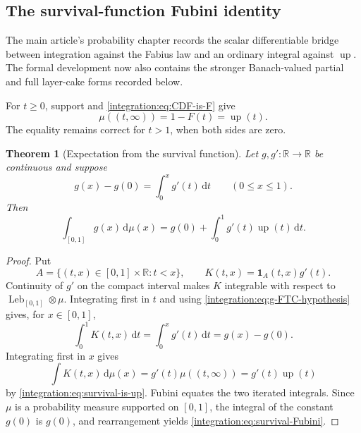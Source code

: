 \documentclass[11pt,oneside]{article}
\newtheorem{theorem}{Theorem}[section]
\theoremstyle{definition}
\theoremstyle{remark}
\newcommand{\R}{\mathbb R}
\newcommand{\Up}{\operatorname{up}}
\newcommand{\dd}{\,\mathrm d}
\begin{document}
\subsection{The survival-function Fubini identity}
\label{integration:sec:survival-fubini}

The main article's probability chapter records the scalar differentiable bridge between
integration against the Fabius law and an ordinary integral against $\Up$.  The formal
development now also contains the stronger Banach-valued partial and full layer-cake forms
recorded below.

For $t\ge0$, support and \eqref{integration:eq:CDF-is-F} give
\begin{equation}
 \mu((t,\infty))=1-F(t)=\Up(t).
 \label{integration:eq:survival-is-up}
\end{equation}
The equality remains correct for $t>1$, when both sides are zero.

\begin{theorem}[Expectation from the survival function]
\label{integration:thm:survival-Fubini}
Let $g,g':\R\to\R$ be continuous and suppose
\begin{equation}
 g(x)-g(0)=\int_0^x g'(t)\dd t
 \qquad(0\le x\le1).
 \label{integration:eq:g-FTC-hypothesis}
\end{equation}
Then
\begin{equation}
 \int_{[0,1]}g(x)\dd\mu(x)
 =g(0)+\int_0^1 g'(t)\Up(t)\dd t.
 \label{integration:eq:survival-Fubini}
\end{equation}
\end{theorem}

\begin{proof}
Put
\begin{equation}
 A=\{(t,x)\in[0,1]\times\R:t<x\},
 \qquad
 K(t,x)=\mathbf1_A(t,x)g'(t).
 \label{integration:eq:Fubini-kernel}
\end{equation}
Continuity of $g'$ on the compact interval makes $K$ integrable with respect to
$\operatorname{Leb}_{[0,1]}\otimes\mu$.  Integrating first in $t$ and using
\eqref{integration:eq:g-FTC-hypothesis} gives, for $x\in[0,1]$,
\begin{equation}
 \int_0^1K(t,x)\dd t=\int_0^xg'(t)\dd t=g(x)-g(0).
 \label{integration:eq:Fubini-first-order}
\end{equation}
Integrating first in $x$ gives
\begin{equation}
 \int K(t,x)\dd\mu(x)=g'(t)\mu((t,\infty))=g'(t)\Up(t)
 \label{integration:eq:Fubini-second-order}
\end{equation}
by \eqref{integration:eq:survival-is-up}.  Fubini equates the two iterated integrals.  Since $\mu$ is a
probability measure supported on $[0,1]$, the integral of the constant $g(0)$ is $g(0)$,
and rearrangement yields \eqref{integration:eq:survival-Fubini}.
\end{proof}
\end{document}
